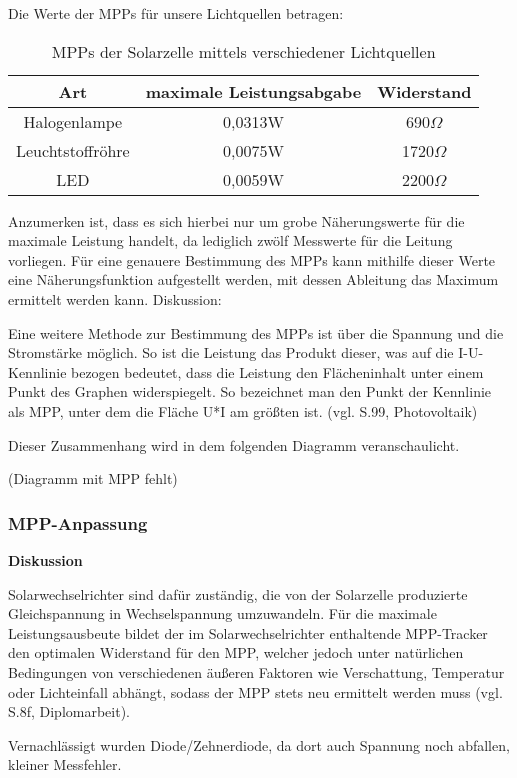         Die Werte der MPPs für unsere Lichtquellen betragen:
        \begin{table}[H]
        	\centering
        	\caption{MPPs der Solarzelle mittels verschiedener Lichtquellen}
        	\label{tab:MPP}
        	\begin{tabular}{ccc}
        		\toprule
        		Art & maximale Leistungsabgabe & Widerstand \\
        		\midrule
        		Halogenlampe & 0,0313W  & 690$\Omega$ \\
        		Leuchtstoffröhre & 0,0075W  & 1720$\Omega$ \\
        		LED & 0,0059W & 2200$\Omega$ \\
        		\bottomrule
        	\end{tabular}
        \end{table}
    
        \par Anzumerken ist, dass es sich hierbei nur um grobe Näherungswerte für die maximale Leistung handelt, da lediglich zwölf Messwerte für die Leitung vorliegen. Für eine genauere Bestimmung des MPPs kann mithilfe dieser Werte eine Näherungsfunktion aufgestellt werden, mit dessen Ableitung das Maximum ermittelt werden kann. 
        Diskussion:
        \par Eine weitere Methode zur Bestimmung des MPPs ist über die Spannung und die Stromstärke möglich. So ist die Leistung das Produkt dieser, was auf die I-U-Kennlinie bezogen bedeutet, dass die Leistung den Flächeninhalt unter einem Punkt des Graphen widerspiegelt. So bezeichnet man den Punkt der Kennlinie als MPP, unter dem die Fläche U*I am größten ist. (vgl. S.99, Photovoltaik)
        \par Dieser Zusammenhang wird in dem folgenden Diagramm veranschaulicht.
        \par (Diagramm mit MPP fehlt)

    \subsubsection{MPP-Anpassung}                                       %
        \textbf{Diskussion}
        \newline
        \par Solarwechselrichter sind dafür zuständig, die von der Solarzelle produzierte Gleichspannung in Wechselspannung umzuwandeln. Für die maximale Leistungsausbeute bildet der im Solarwechselrichter enthaltende MPP-Tracker den optimalen Widerstand für den MPP, welcher jedoch unter natürlichen Bedingungen von verschiedenen äußeren Faktoren wie Verschattung, Temperatur oder Lichteinfall abhängt, sodass der MPP stets neu ermittelt werden muss (vgl. S.8f, Diplomarbeit). 
        
        \par Vernachlässigt wurden Diode/Zehnerdiode, da dort auch Spannung noch abfallen, kleiner Messfehler.
